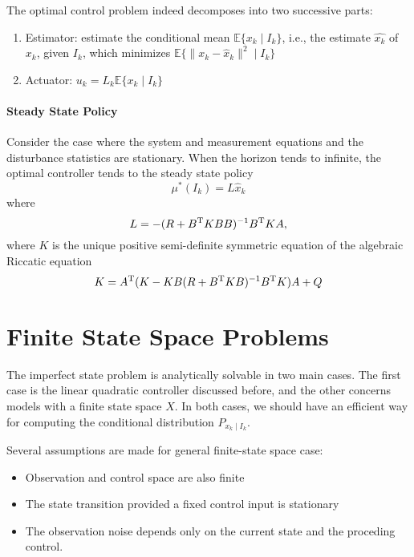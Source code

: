 \begin{remark}
The optimal control problem indeed decomposes into two successive parts:
\begin{enumerate}
\item
Estimator: estimate the conditional mean $\mathbb{E}\{x_k\mid I_k\}$, i.e., the estimate $\hat{x_k}$ of $x_k$, given $I_k$, which minimizes $\mathbb{E}\{\|x_k-\hat{x}_k\|^2\mid I_k\}$
\item
Actuator: $u_k=L_k\mathbb{E}\{x_k\mid I_k\}$
\end{enumerate}

\end{remark}

\paragraph{Steady State Policy}
Consider the case where the system and measurement equations and the disturbance statistics are stationary.
When the horizon tends to infinite, the optimal controller tends to the steady state policy
\[
\mu^*(I_k)=L\hat{x}_k
\]
where 
\[
L=-(R+B^{\mathrm T} KBB)^{-1}B^{\mathrm T} KA,
\]
where $K$ is the unique positive semi-definite symmetric equation of the algebraic Riccatic equation
\[
K = A^{\mathrm T} (K-KB(R+B^{\mathrm T} KB)^{-1}B^{\mathrm T} K)A+Q
\]
\section{Finite State Space Problems}
The imperfect state problem is analytically solvable in two main cases.
The first case is the linear quadratic controller discussed before, and the other concerns models with a finite state space $X$.
In both cases, we should have an efficient way for computing the conditional distribution $P_{x_k\mid I_k}$.

Several assumptions are made for general finite-state space case:
\begin{itemize}
\item
Observation and control space are also finite
\item
The state transition provided a fixed control input is stationary
\item
The observation noise depends only on the current state and the proceding control.
\end{itemize}

